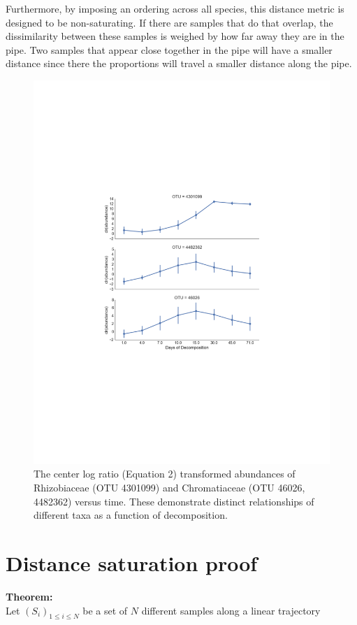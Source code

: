  Furthermore, by imposing an ordering across all species, this distance metric is designed to be non-saturating.  If there are samples that do that overlap, the dissimilarity between these samples is weighed by how far away they are in the pipe.  Two samples that appear close together in the pipe will have a smaller distance since there the proportions will travel a smaller distance along the pipe.

 \begin{figure}[H]
   \centering
   \includegraphics[width=1\textwidth]{appendix_a/FigureS2.pdf}
   \caption[Abundances of taxa across time in the post-mortem experiment.]
           {The center log ratio (Equation 2) transformed abundances of Rhizobiaceae (OTU 4301099) and Chromatiaceae (OTU 46026, 4482362) versus time. These demonstrate distinct relationships of different taxa as a function of decomposition.}
           \label{figaS2}
 \end{figure}
 \section{Distance saturation proof}
 \textbf{Theorem:}\\
 Let $(S_i)_{1 \leq i \leq N}$ be a set of $N$ different samples along a linear trajectory


